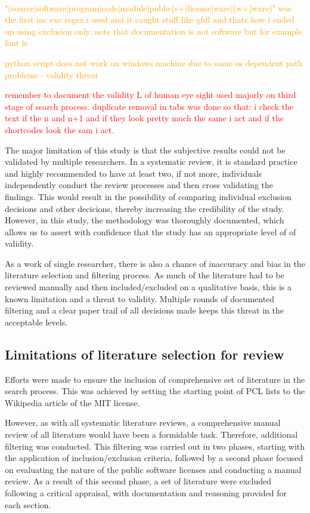 \textcolor{orange}{\\"(source|software|program|code|module|public(s+)license|ware|(w+)ware)" was the first inc exc regex i used and it caught stuff like gfdl and thats how i ended up using exclusion only. note that documentation is not software but for example font is}

\textcolor{orange}{python script does not work on windows machine due to some os dependent path problems - validity threat}

\textcolor{red}{remember to document the validity L of human eye sight used majorly on third stage of search process. duplicate removal in tabs was done so that: i check the text if the n and n+1 and if they look pretty much the same i act and if the shortcodes look the sam i act.}

The major limitation of this study is that the subjective results could not be validated by multiple researchers. In a systematic review, it is standard practice and highly recommended to have at least two, if not more, individuals independently conduct the review processes and then cross validating the findings. This would result in the possibility of comparing individual exclusion decisions and other decicions, thereby increasing the credibility of the study. However, in this study, the methodology was thoroughly documented, which allows us to assert with confidence that the study has an appropriate level of of validity.

As a work of single researcher, there is also a chance of inaccuracy and bias in the literature selection and filtering process. As much of the literature had to be reviewed manually and then included/excluded on a qualitative basis, this is a known limitation and a threat to validity. Multiple rounds of documented filtering and a clear paper trail of all decisions made keeps this threat in the acceptable levels.

\subsection{Limitations of literature selection for review}
Efforts were made to ensure the inclusion of comprehensive set of literature in the search process. This was achieved by setting the starting point of PCL lists to the Wikipedia article of the MIT license.

However, as with all systematic literature reviews, a comprehensive manual review of all literature would have been a formidable task. Therefore, additional filtering was conducted. This filtering was carried out in two phases, starting with the application of inclusion/exclusion criteria, followed by a second phase focused on evaluating the nature of the public software licenses and conducting a manual review. As a result of this second phase, a set of literature were excluded following a critical appraisal, with documentation and reasoning provided for each section.

